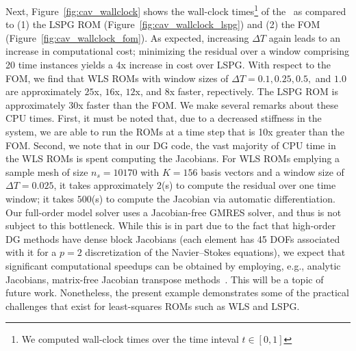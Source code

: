 Next, Figure~\ref{fig:cav_wallclock}
shows the wall-clock times\footnote{We computed wall-clock times over the time inteval $t \in [0,1]$} of the \methodAcronymROMs\ as compared to (1) the LSPG ROM (Figure~\ref{fig:cav_wallclock_lspg}) and (2) the FOM (Figure~\ref{fig:cav_wallclock_fom}).  As expected, increasing $\Delta T$ again leads to an increase in computational cost; minimizing the residual over a window comprising 20 time instances yields a 4x increase in cost over LSPG. With respect to the FOM, we find that WLS ROMs with window sizes of $\Delta T = 0.1, 0.25, 0.5,$  and $1.0$ are approximately $25$x, $16$x, $12$x, and $8$x faster, repectively. The LSPG ROM is approximately 30x faster than the FOM.  We make several remarks about these CPU times. First, it must be noted that, due to a decreased stiffness in the system, we are able to run the ROMs at a time step that is 10x greater than the FOM. Second, we note that in our DG code, the vast majority of CPU time in the WLS ROMs is spent computing the Jacobians. For WLS ROMs emplying a sample mesh of size $n_s=10170$ with $K=156$ basis vectors and a window size of $\Delta T = 0.025$, it takes approximately $2$(s) to compute the residual over one time window; it takes $500$(s) to compute the Jacobian via automatic differentiation. Our full-order model solver uses a Jacobian-free GMRES solver, and thus is not subject to this bottleneck. While this is in part due to the fact that high-order DG methods have dense block Jacobians (each element has 45 DOFs associated with it for a $p=2$ discretization of the Navier--Stokes equations), we expect that significant computational speedups can be obtained by employing, e.g., analytic Jacobians, matrix-free Jacobian transpose methods~\cite{doi:10.2514/6.2016-0833}. This will be a topic of future work. Nonetheless, the present example demonstrates some of the practical challenges that exist for least-squares ROMs such as WLS and LSPG. 

